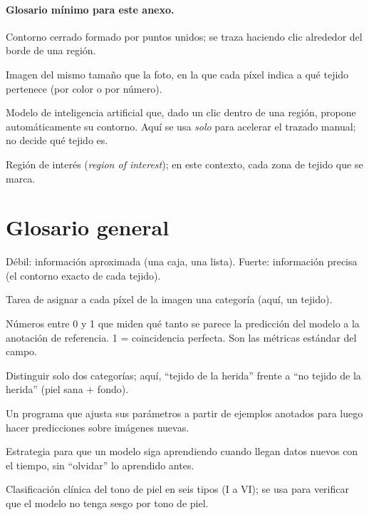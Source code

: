 \documentclass[12pt,letterpaper]{article}
\begin{document}
\paragraph{Glosario mínimo para este anexo.}
\begin{description}[leftmargin=1.5cm,style=nextline]
  \item[Polígono] Contorno cerrado formado por puntos unidos; se traza haciendo clic alrededor del
        borde de una región.
  \item[Máscara] Imagen del mismo tamaño que la foto, en la que cada píxel indica a qué tejido
        pertenece (por color o por número).
  \item[SAM (\textit{Segment Anything Model})] Modelo de inteligencia artificial que, dado un clic
        dentro de una región, propone automáticamente su contorno. Aquí se usa \emph{solo} para
        acelerar el trazado manual; no decide qué tejido es.
  \item[ROI] Región de interés (\textit{region of interest}); en este contexto, cada zona de tejido
        que se marca.
\end{description}

\section{Glosario general}
\label{anexo:glosario}

\begin{description}[leftmargin=2.2cm,style=nextline]
  \item[Anotación débil / fuerte] Débil: información aproximada (una caja, una lista). Fuerte:
        información precisa (el contorno exacto de cada tejido).
  \item[Segmentación] Tarea de asignar a cada píxel de la imagen una categoría (aquí, un tejido).
  \item[Dice / IoU] Números entre 0 y 1 que miden qué tanto se parece la predicción del modelo a la
        anotación de referencia. 1 = coincidencia perfecta. Son las métricas estándar del campo.
  \item[Clasificación binaria] Distinguir solo dos categorías; aquí, ``tejido de la herida'' frente
        a ``no tejido de la herida'' (piel sana + fondo).
  \item[Modelo / entrenar] Un programa que ajusta sus parámetros a partir de ejemplos anotados para
        luego hacer predicciones sobre imágenes nuevas.
  \item[Aprendizaje continuo] Estrategia para que un modelo siga aprendiendo cuando llegan datos
        nuevos con el tiempo, sin ``olvidar'' lo aprendido antes.
  \item[Escala de Fitzpatrick] Clasificación clínica del tono de piel en seis tipos (I a VI); se usa
        para verificar que el modelo no tenga sesgo por tono de piel.
\end{description}
\end{document}

